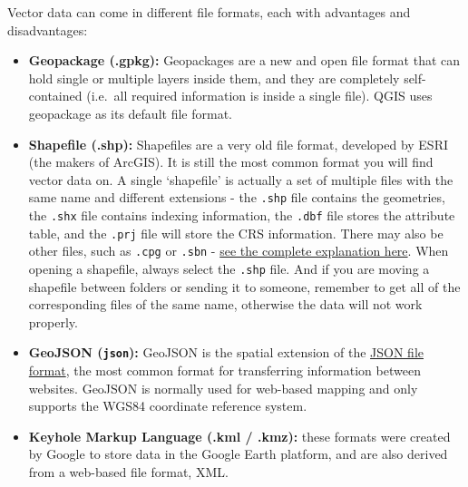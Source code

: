 \documentclass[
  letterpaper,
  DIV=11,
  numbers=noendperiod]{scrreprt}
\begin{document}
\begin{tcolorbox}[enhanced jigsaw, breakable, toptitle=1mm, colback=white, left=2mm, leftrule=.75mm, titlerule=0mm, colframe=quarto-callout-note-color-frame, opacityback=0, title=\textcolor{quarto-callout-note-color}{\faInfo}\hspace{0.5em}{Common vector file formats}, toprule=.15mm, opacitybacktitle=0.6, bottomtitle=1mm, colbacktitle=quarto-callout-note-color!10!white, bottomrule=.15mm, coltitle=black, rightrule=.15mm, arc=.35mm]

Vector data can come in different file formats, each with advantages and
disadvantages:

\begin{itemize}
\item
  \textbf{Geopackage (.gpkg):} Geopackages are a new and open file
  format that can hold single or multiple layers inside them, and they
  are completely self-contained (i.e.~all required information is inside
  a single file). QGIS uses geopackage as its default file format.
\item
  \textbf{Shapefile (.shp):} Shapefiles are a very old file format,
  developed by ESRI (the makers of ArcGIS). It is still the most common
  format you will find vector data on. A single `shapefile' is actually
  a set of multiple files with the same name and different extensions -
  the \texttt{.shp} file contains the geometries, the \texttt{.shx} file
  contains indexing information, the \texttt{.dbf} file stores the
  attribute table, and the \texttt{.prj} file will store the CRS
  information. There may also be other files, such as \texttt{.cpg} or
  \texttt{.sbn} -
  \href{https://en.wikipedia.org/wiki/Shapefile\#:~:text=The\%20shapefile\%20format\%20is\%20a,and\%20other\%20GIS\%20software\%20products}{see
  the complete explanation here}. When opening a shapefile, always
  select the \texttt{.shp} file. And if you are moving a shapefile
  between folders or sending it to someone, remember to get all of the
  corresponding files of the same name, otherwise the data will not work
  properly.
\item
  \textbf{GeoJSON (\texttt{\textquotesingle{}json}):} GeoJSON is the
  spatial extension of the
  \href{https://en.wikipedia.org/wiki/JSON}{JSON file format}, the most
  common format for transferring information between websites. GeoJSON
  is normally used for web-based mapping and only supports the WGS84
  coordinate reference system.
\item
  \textbf{Keyhole Markup Language (.kml / .kmz):} these formats were
  created by Google to store data in the Google Earth platform, and are
  also derived from a web-based file format, XML.
\end{itemize}


\end{tcolorbox}
\end{document}
